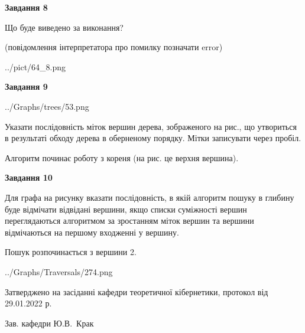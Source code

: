 \documentclass[12pt, ukrainian]{article}
\begin{document}
{\begin {large}
{\begin {center}\textbf{Завдання 8}\end {center}}\par
Що буде виведено за виконання?\par
 (повідомлення інтерпретатора про помилку позначати error)\par
\begin{center}
	{../pict/64_8.png}
\end{center}
\newpage

{\begin {center}\textbf{Завдання 9}\end {center}}\par

\begin{center}
	{../Graphs/trees/53.png}
\end{center}
Указати послідовність міток вершин дерева, зображеного на рис., що утвориться в результаті обходу дерева в оберненому порядку. Мітки записувати через пробіл.\par Алгоритм починає роботу з кореня (на рис. це верхня вершина).\par
\newpage

{\begin {center}\textbf{Завдання 10}\end {center}}\par
Для графа на рисунку вказати послідовність, в якій алгоритм пошуку в глибину буде відмічати відвідані вершини, якщо списки суміжності вершин переглядаються алгоритмом за зростанням міток вершин та вершини відмічаються на першому вход\-женні у вершину.\par
Пошук розпочинається з вершини 2.\par

\begin{center}
	{../Graphs/Traversals/274.png}
\end{center}\par
\newpage


\end {large}
}
{\smallskip \begin {small} Затверджено на засіданні кафедри теоретичної кібернетики, протокол  від   29.01.2022 р.\par\smallskip\smallskip
{\parbox {6.5 cm}{Зав. кафедри \dotfill Ю.В.~Крак}} \end{small}}
\end{document}
